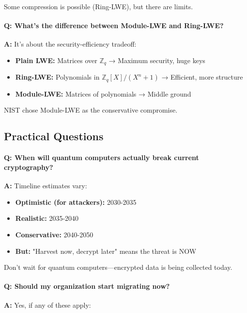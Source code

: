 \documentclass[11pt,a4paper]{article}
\begin{document}
Some compression is possible (Ring-LWE), but there are limits.

\paragraph{Q: What's the difference between Module-LWE and Ring-LWE?}

\textbf{A:} It's about the security-efficiency tradeoff:

\begin{itemize}
    \item \textbf{Plain LWE:} Matrices over $\mathbb{Z}_q$ → Maximum security, huge keys
    \item \textbf{Ring-LWE:} Polynomials in $\mathbb{Z}_q[X]/(X^n+1)$ → Efficient, more structure
    \item \textbf{Module-LWE:} Matrices of polynomials → Middle ground
\end{itemize}

NIST chose Module-LWE as the conservative compromise.

\subsection{Practical Questions}

\paragraph{Q: When will quantum computers actually break current cryptography?}

\textbf{A:} Timeline estimates vary:

\begin{itemize}
    \item \textbf{Optimistic (for attackers):} 2030-2035
    \item \textbf{Realistic:} 2035-2040
    \item \textbf{Conservative:} 2040-2050
    \item \textbf{But:} "Harvest now, decrypt later" means the threat is NOW
\end{itemize}

Don't wait for quantum computers—encrypted data is being collected today.

\paragraph{Q: Should my organization start migrating now?}

\textbf{A:} Yes, if any of these apply:
\end{document}
